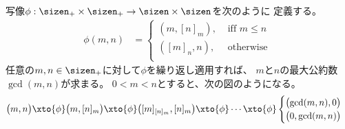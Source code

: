 	\begin{procedure}[ユークリッドの互除法]
	\label{proc:ユークリッドの互除法} %
		写像$\phi:\sizen_+\times\sizen_+\to\sizen\times\sizen$を次のように
		定義する。
		\begin{equation*}\begin{split}
			\phi(m, n) &= \begin{cases}
				(m, [n]_m), &\text{ iff } m\le n \\
				([m]_n, n), &\text{ otherwise } \\
			\end{cases}
		\end{split}\end{equation*}
		任意の$m,n\in\sizen_+$に対して$\phi$を繰り返し適用すれば、
		$m$と$n$の最大公約数$\gcd(m,n)$が求まる。
		$0<m<n$とすると、次の図のようになる。
		\begin{equation}\label{eq:ユークリッド互除法}\begin{split}
			\bigl(m,n\bigr) \xto{\phi} \bigl(m,[n]_m\bigr)
			\xto{\phi} \bigl([m]_{[n]_m},[n]_m\bigr)
			\xto{\phi} \cdots \xto{\phi} \begin{cases}
				\bigl(\gcd(m, n), 0\bigr) \\
				\bigl(0, \gcd(m, n)\bigr)
			\end{cases}
		\end{split}\end{equation}
	\end{procedure} %

